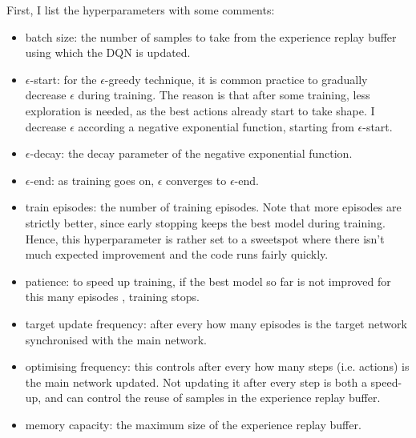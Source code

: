 First, I list the hyperparameters with some comments:

\begin{itemize} 
    \item batch size: the number of samples to take from the experience replay buffer using which the DQN is updated.
    
    \item $\epsilon$-start: for the $\epsilon$-greedy technique, it is common practice to gradually decrease $\epsilon$ during training. The reason is that after some training, less exploration is needed, as the best actions already start to take shape. I decrease $\epsilon$ according a negative exponential function, starting from $\epsilon$-start.
    
    \item $\epsilon$-decay: the decay parameter of the negative exponential function.
    
    \item $\epsilon$-end: as training goes on, $\epsilon$ converges to $\epsilon$-end.
     
    
    \item train episodes: the number of training episodes. Note that more episodes are strictly better, since early stopping keeps the best model during training. Hence, this hyperparameter is rather set to a sweetspot where there isn't much expected improvement and the code runs fairly quickly. 
    
    \item patience: to speed up training, if the best model so far is not improved for this many episodes , training stops.
    
    \item target update frequency: after every how many episodes is the target network synchronised with the main network.
    
    \item optimising frequency: this controls after every how many steps (i.e. actions) is the main network updated. Not updating it after every step is both a speed-up, and can control the reuse of samples in the experience replay buffer.
    
    \item memory capacity: the maximum size of the experience replay buffer.
    

\end{itemize}
